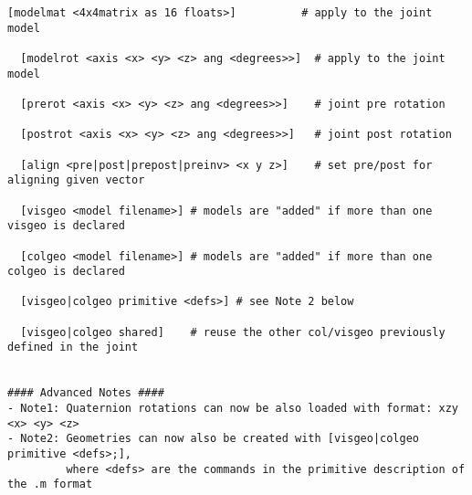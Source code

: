 \begin{lstlisting}[title={}]
  [modelmat <4x4matrix as 16 floats>]          # apply to the joint model

  [modelrot <axis <x> <y> <z> ang <degrees>>]  # apply to the joint model

  [prerot <axis <x> <y> <z> ang <degrees>>]    # joint pre rotation

  [postrot <axis <x> <y> <z> ang <degrees>>]   # joint post rotation

  [align <pre|post|prepost|preinv> <x y z>]    # set pre/post for aligning given vector

  [visgeo <model filename>] # models are "added" if more than one visgeo is declared

  [colgeo <model filename>] # models are "added" if more than one colgeo is declared

  [visgeo|colgeo primitive <defs>] # see Note 2 below
  
  [visgeo|colgeo shared]    # reuse the other col/visgeo previously defined in the joint


#### Advanced Notes ####
- Note1: Quaternion rotations can now be also loaded with format: xzy <x> <y> <z>
- Note2: Geometries can now also be created with [visgeo|colgeo primitive <defs>;],
         where <defs> are the commands in the primitive description of the .m format

\end{lstlisting}
